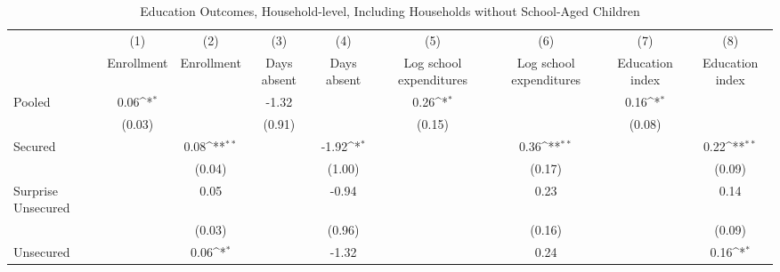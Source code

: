 \begin{table}[htbp]\centering
\def\sym#1{\ifmmode^{#1}\else\(^{#1}\)\fi}
\caption{Education Outcomes, Household-level, Including Households without School-Aged Children\label{endline\_educ\_hh\_full}}
\begin{tabular}{l*{8}{c}}
\toprule
                    &\multicolumn{1}{c}{(1)}&\multicolumn{1}{c}{(2)}&\multicolumn{1}{c}{(3)}&\multicolumn{1}{c}{(4)}&\multicolumn{1}{c}{(5)}&\multicolumn{1}{c}{(6)}&\multicolumn{1}{c}{(7)}&\multicolumn{1}{c}{(8)}\\
                    &\multicolumn{1}{c}{Enrollment}&\multicolumn{1}{c}{Enrollment}&\multicolumn{1}{c}{Days absent}&\multicolumn{1}{c}{Days absent}&\multicolumn{1}{c}{Log school expenditures}&\multicolumn{1}{c}{Log school expenditures}&\multicolumn{1}{c}{Education index}&\multicolumn{1}{c}{Education index}\\
\midrule
Pooled              &        0.06\sym{*}  &                     &       -1.32         &                     &        0.26\sym{*}  &                     &        0.16\sym{*}  &                     \\
                    &      (0.03)         &                     &      (0.91)         &                     &      (0.15)         &                     &      (0.08)         &                     \\\addlinespace
Secured             &                     &        0.08\sym{**} &                     &       -1.92\sym{*}  &                     &        0.36\sym{**} &                     &        0.22\sym{**} \\
                    &                     &      (0.04)         &                     &      (1.00)         &                     &      (0.17)         &                     &      (0.09)         \\\addlinespace
Surprise Unsecured  &                     &        0.05         &                     &       -0.94         &                     &        0.23         &                     &        0.14         \\
                    &                     &      (0.03)         &                     &      (0.96)         &                     &      (0.16)         &                     &      (0.09)         \\\addlinespace
Unsecured           &                     &        0.06\sym{*}  &                     &       -1.32         &                     &        0.24         &                     &        0.16\sym{*}  \\

\end{tabular}
\end{table}

